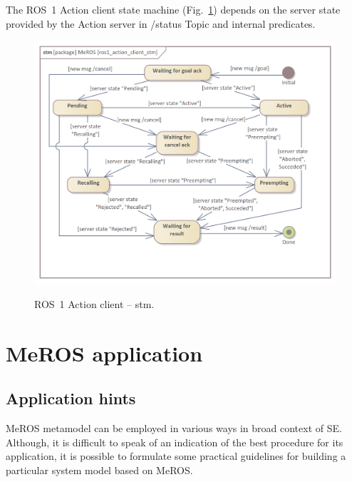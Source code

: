 \documentclass[11pt,oneside,a4paper]{article}
\begin{document}
	\pagebreak
	
	
	The ROS~1 Action client state machine (Fig.~\ref{fig:ros1_action_client_stm}) depends on the server state provided by the Action server in /status Topic and internal predicates. 
		
	\begin{figure}[H]
		\centering
		\begin{center}
			{\includegraphics[scale=1.0]{img/meros_pkg/ros1_action_client_stm.png}}
		\end{center}
		\caption{ROS~1 Action client -- stm.}
		\label{fig:ros1_action_client_stm}
	\end{figure}
	
	
\section{MeROS application}
\label{sec:application}
	
	
\subsection{Application hints}
\label{sec:application-hints}

	MeROS metamodel can be employed in various ways in broad context of SE. Although, it is difficult to speak of an indication of the best procedure for its application, it is possible to formulate some practical guidelines for building a particular system model based on MeROS. 
\end{document}
